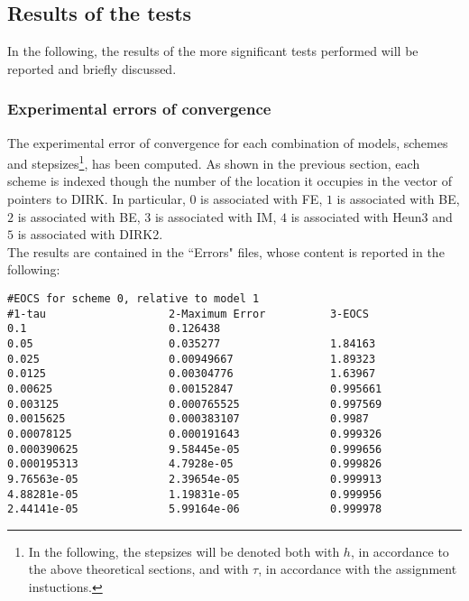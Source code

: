 \documentclass[11pt]{article}
\theoremstyle{theorem}
\theoremstyle{definition}
\begin{document}
\subsection{Results of the tests}
In the following, the results of the more significant tests performed will be reported and briefly discussed.\\

\subsubsection{Experimental errors of convergence}
The experimental error of convergence for each combination of models, schemes and stepsizes\footnote{In the following, the stepsizes will be denoted both with $h$, in accordance to the above theoretical sections, and with $\tau$, in accordance with the assignment instuctions.}, has been computed. As shown in the previous section, each scheme is indexed though the number of the location it occupies in the vector of pointers to DIRK. In particular, $0$ is associated with FE, $1$ is associated with BE, $2$ is associated with BE, $3$ is associated with IM, $4$ is associated with Heun3 and $5$ is associated with DIRK2.\\


 The results are contained in the ``Errors" files, whose content is reported in the following:


\begin{lstlisting}
#EOCS for scheme 0, relative to model 1
#1-tau                   2-Maximum Error          3-EOCS                   
0.1                      0.126438                 	
0.05                     0.035277                 1.84163
0.025                    0.00949667               1.89323
0.0125                   0.00304776               1.63967
0.00625                  0.00152847               0.995661
0.003125                 0.000765525              0.997569
0.0015625                0.000383107              0.9987
0.00078125               0.000191643              0.999326
0.000390625              9.58445e-05              0.999656
0.000195313              4.7928e-05               0.999826
9.76563e-05              2.39654e-05              0.999913
4.88281e-05              1.19831e-05              0.999956
2.44141e-05              5.99164e-06              0.999978
\end{lstlisting}
\end{document}
